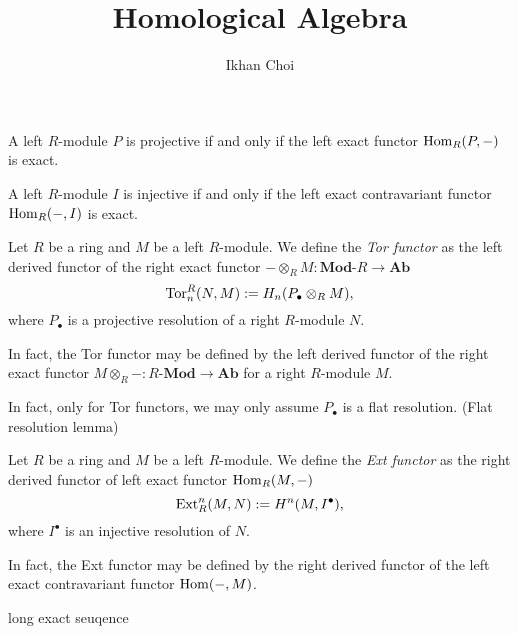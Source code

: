 \documentclass{../../large}
\newcommand{\Ab}{\mathbf{Ab}}
\newcommand{\Mod}{\mathbf{Mod}}
\begin{document}
\title{Homological Algebra}
\author{Ikhan Choi}
\maketitle
\tableofcontents


\part{}

\chapter{}

A left $R$-module $P$ is projective if and only if the left exact functor $\operatorname{Hom}_R(P,-)$ is exact.

A left $R$-module $I$ is injective if and only if the left exact contravariant functor $\operatorname{Hom}_R(-,I)$ is exact.


\begin{prb}
Let $R$ be a ring and $M$ be a left $R$-module.
We define the \emph{Tor functor} as the left derived functor of the right exact functor $-\otimes_RM:\Mod\text{-}R\to\Ab$
\[\operatorname{Tor}_n^R(N,M):=H_n(P_\bullet\otimes_RM),\]
where $P_\bullet$ is a projective resolution of a right $R$-module $N$.
\begin{parts}
\item In fact, the Tor functor may be defined by the left derived functor of the right exact functor $M\otimes_R-:R\text{-}\Mod\to\Ab$ for a right $R$-module $M$.
\item In fact, only for Tor functors, we may only assume $P_\bullet$ is a flat resolution. (Flat resolution lemma)
\end{parts}
\end{prb}

\begin{prb}
Let $R$ be a ring and $M$ be a left $R$-module.
We define the \emph{Ext functor} as the right derived functor of left exact functor $\operatorname{Hom}_R(M,-)$
\[\operatorname{Ext}_R^n(M,N):=H^n(M,I^\bullet),\]
where $I^\bullet$ is an injective resolution of $N$.
\begin{parts}
\item In fact, the Ext functor may be defined by the right derived functor of the left exact contravariant functor $\operatorname{Hom}(-,M)$.
\end{parts}
\end{prb}

long exact seuqence
\end{document}
